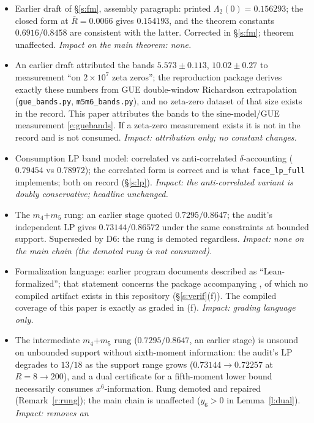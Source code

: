 \documentclass[11pt]{article}
\numberwithin{equation}{section}
\theoremstyle{definition}
\theoremstyle{remark}
\begin{document}
\begin{itemize}
\item[D1.] Earlier draft of \S\ref{s:fm}, assembly paragraph:
printed $\Lambda_2(0)=0.156293$; the closed form at $\bar R=0.0066$ gives
$0.154193$, and the theorem constants $0.6916/0.8458$ are
consistent with the latter. Corrected in \S\ref{s:fm}; theorem
unaffected. \emph{Impact on the main theorem: none.}
\item[D2.] An earlier draft attributed the bands
$5.573\pm0.113$, $10.02\pm0.27$ to measurement ``on
$2\times10^{7}$ zeta zeros''; the reproduction package derives
exactly these numbers from GUE double-window Richardson
extrapolation (\texttt{gue\_bands.py},
\texttt{m5m6\_bands.py}), and no zeta-zero
dataset of that size exists in the record. This paper
attributes the bands to the sine-model/GUE measurement
\eqref{e:guebands}. If a zeta-zero measurement exists it is not
in the record and is not consumed. \emph{Impact: attribution
only; no constant changes.}
\item[D3.] Consumption LP band model: correlated vs
anti-correlated $\delta$-accounting ($0.79454$ vs $0.78972$);
the correlated form is correct and is what
\texttt{face\_lp\_full} implements; both on record
(\S\ref{s:lp}). \emph{Impact: the anti-correlated variant is
doubly conservative; headline unchanged.}
\item[D4.] The $m_4$+$m_5$ rung: an earlier stage quoted
$0.7295/0.8647$; the audit's independent LP gives
$0.73144/0.86572$ under the same constraints at bounded support.
Superseded by D6: the rung is demoted regardless.
\emph{Impact: none on the main chain (the demoted rung is not
consumed).}
\item[D5.] Formalization language: earlier program documents
described \cite{C26} as ``Lean-formalized''; that statement
concerns the package accompanying \cite{C26}, of which no
compiled artifact exists in this repository
(\S\ref{s:verif}(f)). The compiled coverage of this paper is
exactly as graded in (f).
\emph{Impact: grading language only.}
\item[D6.] The intermediate $m_4$+$m_5$ rung
($0.7295/0.8647$, an earlier stage) is unsound on unbounded
support without sixth-moment information: the audit's LP degrades
to $13/18$ as the support range grows ($0.73144\to0.72257$ at
$R=8\to200$), and a dual certificate for a fifth-moment lower
bound necessarily consumes $x^6$-information. Rung demoted and
repaired (Remark~\ref{r:rung}); the main chain is unaffected
($y_6>0$ in Lemma~\ref{l:dual}). \emph{Impact: removes an
}
\end{itemize}
\end{document}
